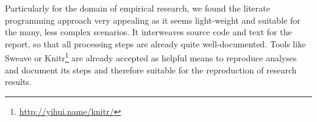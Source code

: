 \documentclass{sig-alternate}
\begin{document}
Particularly for the domain of empirical research, we found the literate programming approach very appealing as it seems light-weight and suitable for the many, less complex scenarios.
It interweaves source code and text for the report, so that all processing steps are already quite well-documented. 
Tools like Sweave \cite{lmucs_papers_Leisch_2002} or Knitr\footnote{\url{http://yihui.name/knitr/}} are already accepted as helpful means to reproduce analyses and document its steps
\cite{leisch2011executable}
%
\cite{rossini2003literate}
and therefore suitable for the reproduction of research results. 

%
%
%
%

\end{document}
